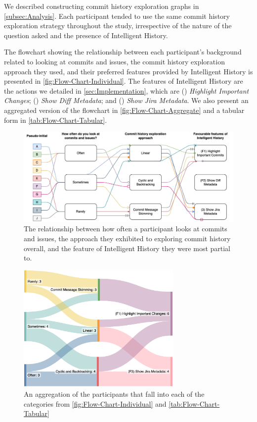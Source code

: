 We described constructing commit history exploration graphs in \autoref{subsec:Analysis}. 
Each participant tended to use the same commit history exploration strategy throughout the study, 
irrespective of the nature of the question asked and the presence of Intelligent History.

The flowchart showing the relationship between each participant's background related to looking at commits and issues,
the commit history exploration approach they used, and their preferred features 
provided by Intelligent History is presented in \autoref{fig:Flow-Chart-Individual}.
The features of Intelligent History are the actions we detailed in \autoref{sec:Implementation}, which are 
() \textit{Highlight Important Changes}; 
() \textit{Show Diff Metadata}; 
and () \textit{Show Jira Metadata}.
We also present an aggregated version of the flowchart in \autoref{fig:Flow-Chart-Aggregate} 
and a tabular form in \autoref{tab:Flow-Chart-Tabular}.

\begin{figure}[h]
  \centering
  \includegraphics[width=12cm]{./images/flow-chart-ind.png}
  \caption{
    The relationship between how often a participant looks at commits and issues, 
    the approach they exhibited to exploring commit history overall, 
    and the feature of Intelligent History they were most partial to.
  }
  \label{fig:Flow-Chart-Individual}
\end{figure}

\begin{figure}[h]
  \centering
  \includegraphics[width=8cm]{./images/flow-chart-aggr.png}
  \caption{
    An aggregation of the participants that fall into each of the categories from \autoref{fig:Flow-Chart-Individual} and \autoref{tab:Flow-Chart-Tabular}
  }
  \label{fig:Flow-Chart-Aggregate}
\end{figure}

